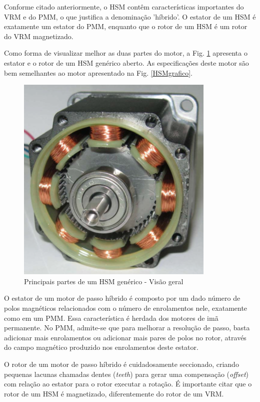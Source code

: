 	Conforme citado anteriormente, o HSM contêm características importantes do VRM e do PMM, o que justifica a denominação 'híbrido'. O estator de um HSM é exatamente um estator do PMM, enquanto que o rotor de um HSM é um rotor do VRM magnetizado.
	
	Como forma de visualizar melhor as duas partes do motor, a Fig. \ref{HSMreal} apresenta o estator e o rotor de um HSM genérico aberto. As especificações deste motor são bem semelhantes ao motor apresentado na Fig. \ref{HSMgrafico}.
	
	\begin{figure}[H]
		\centering
		\includegraphics[scale=.45]{Images/hsmreal1.png}
		\caption{Principais partes de um HSM genérico - Visão geral \cite{ieeeRusso}}
		\label{HSMreal}
	\end{figure} 
	
	O estator de um motor de passo híbrido é composto por um dado número de polos magnéticos relacionados com o número de enrolamentos nele, exatamente como em um PMM. Essa característica é herdada dos motores de imã permanente. No PMM, admite-se que para melhorar a resolução de passo, basta adicionar mais enrolamentos ou adicionar mais pares de polos no rotor, através do campo magnético produzido nos enrolamentos deste estator. 
	
	O rotor de um motor de passo híbrido é cuidadosamente seccionado, criando pequenas lacunas chamadas dentes (\textit{teeth}) para gerar uma compensação (\textit{offset}) com relação ao estator para o rotor executar a rotação. É importante citar que o rotor de um HSM é magnetizado, diferentemente do rotor de um VRM.
	
